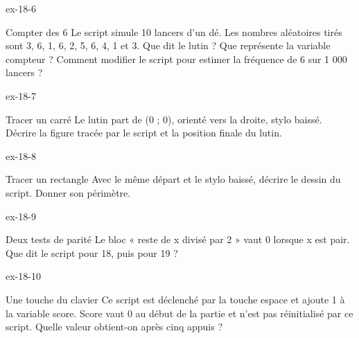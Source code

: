 \begin{blocLivre}{ex-18-6}\begin{exercice}[2]{Compter des 6}
Le script simule 10 lancers d’un dé. Les nombres aléatoires tirés sont 3, 6, 1, 6, 2, 5, 6, 4, 1 et 3. Que dit le lutin ? Que représente la variable compteur ? Comment modifier le script pour estimer la fréquence de 6 sur 1 000 lancers ?
\label{fig-ex-18-6}
\end{exercice}\end{blocLivre}
\begin{blocLivre}{ex-18-7}\begin{exercice}[2]{Tracer un carré}
Le lutin part de (0 ; 0), orienté vers la droite, stylo baissé. Décrire la figure tracée par le script et la position finale du lutin.
\label{fig-ex-18-7}
\end{exercice}\end{blocLivre}
\begin{blocLivre}{ex-18-8}\begin{exercice}[2]{Tracer un rectangle}
Avec le même départ et le stylo baissé, décrire le dessin du script. Donner son périmètre.
\label{fig-ex-18-8}
\end{exercice}\end{blocLivre}
\begin{blocLivre}{ex-18-9}\begin{exercice}[2]{Deux tests de parité}
Le bloc « reste de x divisé par 2 » vaut 0 lorsque x est pair. Que dit le script pour 18, puis pour 19 ?
\label{fig-ex-18-9}
\end{exercice}\end{blocLivre}
\begin{blocLivre}{ex-18-10}\begin{exercice}[2]{Une touche du clavier}
Ce script est déclenché par la touche espace et ajoute 1 à la variable score. Score vaut 0 au début de la partie et n’est pas réinitialisé par ce script. Quelle valeur obtient-on après cinq appuis ?
\label{fig-ex-18-10}
\end{exercice}\end{blocLivre}

